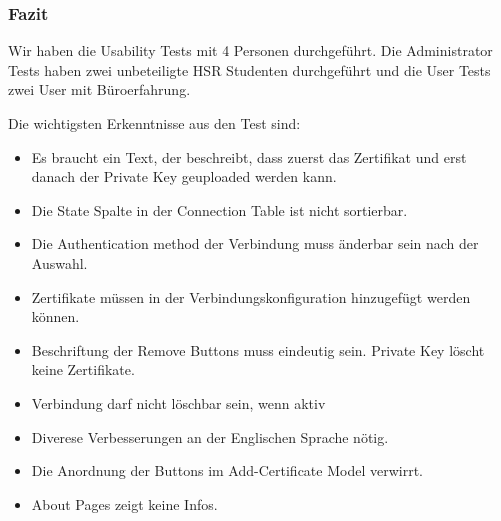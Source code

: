 \subsubsection{Fazit}
Wir haben die Usability Tests mit 4 Personen durchgeführt. Die Administrator Tests haben zwei unbeteiligte HSR Studenten durchgeführt und die User Tests zwei User mit Büroerfahrung.

Die wichtigsten Erkenntnisse aus den Test sind:
\begin{itemize}
    \item Es braucht ein Text, der beschreibt, dass zuerst das Zertifikat und erst danach der Private Key geuploaded werden kann.
    \item Die State Spalte in der Connection Table ist nicht sortierbar.
    \item Die Authentication method der Verbindung muss änderbar sein nach der Auswahl.
    \item Zertifikate müssen in der Verbindungskonfiguration hinzugefügt werden können.
    \item Beschriftung der Remove Buttons muss eindeutig sein. Private Key löscht keine Zertifikate.
    \item Verbindung darf nicht löschbar sein, wenn aktiv
    \item Diverese Verbesserungen an der Englischen Sprache nötig.
    \item Die Anordnung der Buttons im Add-Certificate Model verwirrt.
    \item About Pages zeigt keine Infos.
\end{itemize}
